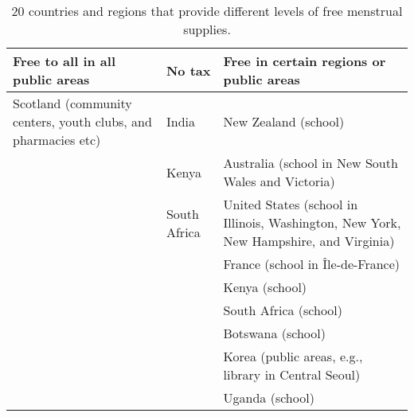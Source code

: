 \begin{table*}[ht]
    \centering
    \caption{20 countries and regions that provide different levels of free menstrual supplies.}
    \begin{tabular}{|p{}|p{}|p{}|}
        \hline
        \textbf{Free to all in all public areas}                      & \textbf{No tax} & \textbf{Free in certain regions or public areas}                                                          \\ \hline
        Scotland (community centers, youth clubs, and pharmacies etc) & India           & New Zealand (school)                                                                                      \\ \hline
                                                                      & Kenya           & Australia (school in New South Wales and Victoria)                                                        \\ \hline
                                                                      & South Africa    & United States (school in Illinois, Washington, New York, New Hampshire, and Virginia)                     \\ \hline
                                                                      &                 & France (school in Île-de-France)                                                                          \\ \hline
                                                                      &                 & Kenya (school)                                                                                            \\ \hline
                                                                      &                 & South Africa (school)                                                                                     \\ \hline
                                                                      &                 & Botswana (school)                                                                                         \\ \hline
                                                                      &                 & Korea (public areas, e.g., library in Central Seoul)                                                      \\ \hline
                                                                      &                 & Uganda (school)                                                                                           \\ \hline

\end{tabular}
\end{table*}
